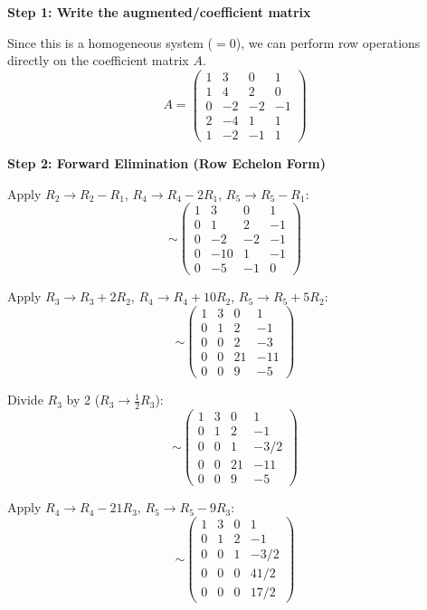 \documentclass[12pt,a3paper]{article}
\begin{document}
\begin{tcolorbox}[enhanced,breakable,
  colback=cB!4,colframe=cB,boxrule=0.8pt,arc=5pt,
  title={\textbf{Answer --- Gauss-Jordan Elimination Method}},
  fonttitle=\bfseries\color{white},colbacktitle=cB]

\textbf{Step 1: Write the augmented/coefficient matrix}

Since this is a homogeneous system ($=0$), we can perform row operations directly on the coefficient matrix $A$.
\[
A = \begin{pmatrix}
1 & 3 & 0 & 1 \\
1 & 4 & 2 & 0 \\
0 & -2 & -2 & -1 \\
2 & -4 & 1 & 1 \\
1 & -2 & -1 & 1
\end{pmatrix}
\]

\medskip
\textbf{Step 2: Forward Elimination (Row Echelon Form)}

Apply $R_2 \to R_2 - R_1$, $R_4 \to R_4 - 2R_1$, $R_5 \to R_5 - R_1$:
\[
\sim \begin{pmatrix}
1 & 3 & 0 & 1 \\
0 & 1 & 2 & -1 \\
0 & -2 & -2 & -1 \\
0 & -10 & 1 & -1 \\
0 & -5 & -1 & 0
\end{pmatrix}
\]

Apply $R_3 \to R_3 + 2R_2$, $R_4 \to R_4 + 10R_2$, $R_5 \to R_5 + 5R_2$:
\[
\sim \begin{pmatrix}
1 & 3 & 0 & 1 \\
0 & 1 & 2 & -1 \\
0 & 0 & 2 & -3 \\
0 & 0 & 21 & -11 \\
0 & 0 & 9 & -5
\end{pmatrix}
\]

Divide $R_3$ by 2 ($R_3 \to \frac{1}{2}R_3$):
\[
\sim \begin{pmatrix}
1 & 3 & 0 & 1 \\
0 & 1 & 2 & -1 \\
0 & 0 & 1 & -3/2 \\
0 & 0 & 21 & -11 \\
0 & 0 & 9 & -5
\end{pmatrix}
\]

Apply $R_4 \to R_4 - 21R_3$, $R_5 \to R_5 - 9R_3$:
\[
\sim \begin{pmatrix}
1 & 3 & 0 & 1 \\
0 & 1 & 2 & -1 \\
0 & 0 & 1 & -3/2 \\
0 & 0 & 0 & 41/2 \\
0 & 0 & 0 & 17/2
\end{pmatrix}
\]


\end{tcolorbox}
\end{document}
